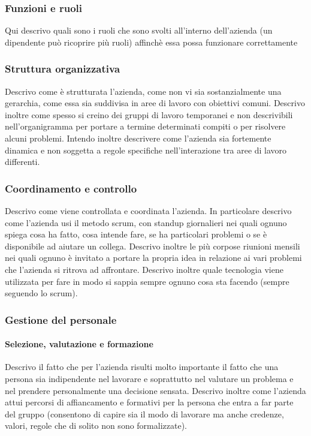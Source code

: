 			\subsubsection{Funzioni e ruoli}
				Qui descrivo quali sono i ruoli che sono svolti all'interno dell'azienda (un dipendente può ricoprire più ruoli)
				affinchè essa possa funzionare correttamente
			\subsubsection{Struttura organizzativa}
				Descrivo come è strutturata l'azienda, come non vi sia sostanzialmente una gerarchia, come essa sia suddivisa in
				aree di lavoro con obiettivi comuni. Descrivo inoltre come spesso si creino dei gruppi di lavoro temporanei e non
				descrivibili nell'organigramma per portare a termine determinati compiti o per risolvere alcuni problemi. Intendo
				inoltre descrivere come l'azienda sia fortemente dinamica e non soggetta a regole specifiche nell'interazione tra
				aree di lavoro differenti.
			\subsubsection{Coordinamento e controllo}
				Descrivo come viene controllata e coordinata l'azienda. In particolare descrivo come l'azienda usi il metodo scrum,
				con standup giornalieri nei quali ognuno spiega cosa ha fatto, cosa intende fare, se ha particolari problemi o se è
				disponibile ad aiutare un collega. Descrivo inoltre le più corpose riunioni mensili nei quali ognuno è invitato a
				portare la propria idea in relazione ai vari problemi che l'azienda si ritrova ad affrontare. Descrivo inoltre quale
				tecnologia viene utilizzata per fare in modo si sappia sempre ognuno cosa sta facendo (sempre seguendo lo scrum).
			\subsubsection{Gestione del personale}
				\paragraph{Selezione, valutazione e formazione}
					Descrivo il fatto che per l'azienda risulti molto importante il fatto che una persona sia indipendente nel
					lavorare e soprattutto nel valutare un problema e nel prendere personalmente una decisione sensata.
					Descrivo inoltre come l'azienda attui percorsi di affiancamento e formativi per la persona che entra a far
					parte del gruppo (consentono di capire sia il modo di lavorare ma anche credenze, valori, regole che di
					solito non sono formalizzate).
